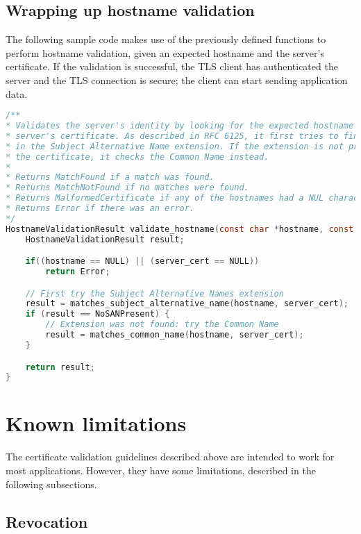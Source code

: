 \documentclass{article}
\begin{document}
\subsection{Wrapping up hostname validation}

The following sample code makes use of the previously defined functions to
perform hostname validation, given an expected hostname and the server's
certificate. If the validation is successful, the TLS client has authenticated
the server and the TLS connection is secure; the client can start sending 
application data.

\begin{lstlisting}[style=code,language=C,numbers=none,caption={}]
/**
* Validates the server's identity by looking for the expected hostname in the
* server's certificate. As described in RFC 6125, it first tries to find a match
* in the Subject Alternative Name extension. If the extension is not present in
* the certificate, it checks the Common Name instead.
*
* Returns MatchFound if a match was found.
* Returns MatchNotFound if no matches were found.
* Returns MalformedCertificate if any of the hostnames had a NUL character embedded in it.
* Returns Error if there was an error.
*/
HostnameValidationResult validate_hostname(const char *hostname, const X509 *server_cert) {
	HostnameValidationResult result;

	if((hostname == NULL) || (server_cert == NULL))
		return Error;

	// First try the Subject Alternative Names extension
	result = matches_subject_alternative_name(hostname, server_cert);
	if (result == NoSANPresent) {
		// Extension was not found: try the Common Name
		result = matches_common_name(hostname, server_cert);
	}

	return result;
}
\end{lstlisting}


\section{Known limitations}
\label{sec:limitations}
The certificate validation guidelines described above are intended to work for
most applications. However, they have some limitations, described in the
following subsections.


\subsection{Revocation}
\end{document}
